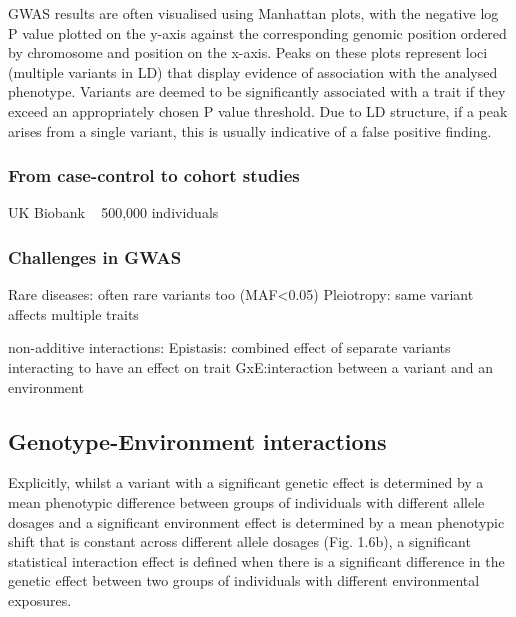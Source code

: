 \cite{mccarthy2008genome}

GWAS results are often visualised using Manhattan plots, with the negative log P value plotted on the y-axis against the corresponding genomic position ordered by chromosome and position on the x-axis. 
Peaks on these plots represent loci (multiple variants in LD) that display evidence of association with the analysed phenotype. 
Variants are deemed to be significantly associated with a trait if they exceed an appropriately chosen P value threshold. Due to LD structure, if a peak arises from a single variant, this is usually indicative of a false positive finding.

\subsubsection{From case-control to cohort studies}

UK Biobank ~ 500,000 individuals

\subsubsection{Challenges in GWAS}

Rare diseases: often rare variants too (MAF<0.05)
Pleiotropy: same variant affects multiple traits

non-additive interactions:
Epistasis: combined effect of separate variants interacting to have an effect on trait
GxE:interaction between a variant and an environment


\subsection{Genotype-Environment interactions}

Explicitly, whilst a variant with a significant genetic effect is determined by a mean phenotypic difference between groups of individuals with different allele dosages and a significant environment effect is determined by a mean phenotypic shift that is constant across different allele dosages (Fig. 1.6b), a significant statistical interaction effect is defined when there is a significant difference in the genetic effect between two groups of individuals with different environmental exposures.


